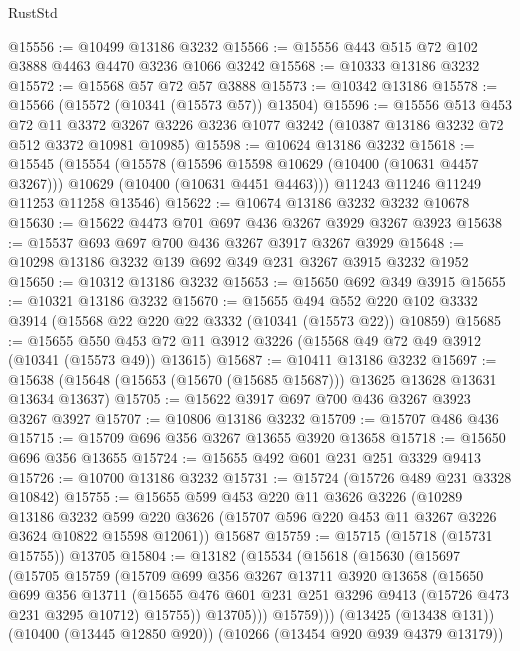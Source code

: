 \begin{lexlean}{RustStd}
\begin{coremodule}
{\begin{coremodule}
{{{{{{{{{{{{{{{{{{{{{{{{{@15556 := @10499 @13186 @3232
@15566 := @15556 @443 @515 @72 @102 @3888 @4463 @4470 @3236 @1066 @3242
@15568 := @10333 @13186 @3232
@15572 := @15568 @57 @72 @57 @3888
@15573 := @10342 @13186
@15578 := @15566 (@15572 (@10341 (@15573 @57)) @13504)
@15596 := @15556
    @513
    @453
    @72
    @11
    @3372
    @3267
    @3226
    @3236
    @1077
    @3242
    (@10387 @13186 @3232 @72 @512 @3372 @10981 @10985)
@15598 := @10624 @13186 @3232
@15618 := @15545
    (@15554
      (@15578
        (@15596 @15598 @10629 (@10400 (@10631 @4457 @3267)))
        @10629
        (@10400 (@10631 @4451 @4463)))
      @11243
      @11246
      @11249
      @11253
      @11258
      @13546)
@15622 := @10674 @13186 @3232 @3232 @10678
@15630 := @15622 @4473 @701 @697 @436 @3267 @3929 @3267 @3923
@15638 := @15537 @693 @697 @700 @436 @3267 @3917 @3267 @3929
@15648 := @10298 @13186 @3232 @139 @692 @349 @231 @3267 @3915 @3232 @1952
@15650 := @10312 @13186 @3232
@15653 := @15650 @692 @349 @3915
@15655 := @10321 @13186 @3232
@15670 := @15655
    @494
    @552
    @220
    @102
    @3332
    @3914
    (@15568 @22 @220 @22 @3332 (@10341 (@15573 @22)) @10859)
@15685 := @15655
    @550
    @453
    @72
    @11
    @3912
    @3226
    (@15568 @49 @72 @49 @3912 (@10341 (@15573 @49)) @13615)
@15687 := @10411 @13186 @3232
@15697 := @15638 (@15648 (@15653 (@15670 (@15685 @15687))) @13625 @13628 @13631 @13634 @13637)
@15705 := @15622 @3917 @697 @700 @436 @3267 @3923 @3267 @3927
@15707 := @10806 @13186 @3232
@15709 := @15707 @486 @436
@15715 := @15709 @696 @356 @3267 @13655 @3920 @13658
@15718 := @15650 @696 @356 @13655
@15724 := @15655 @492 @601 @231 @251 @3329 @9413
@15726 := @10700 @13186 @3232
@15731 := @15724 (@15726 @489 @231 @3328 @10842)
@15755 := @15655
    @599
    @453
    @220
    @11
    @3626
    @3226
    (@10289
      @13186
      @3232
      @599
      @220
      @3626
      (@15707 @596 @220 @453 @11 @3267 @3226 @3624 @10822 @15598 @12061))
    @15687
@15759 := @15715 (@15718 (@15731 @15755)) @13705
@15804 := @13182
    (@15534
      (@15618
        (@15630
          (@15697
            (@15705
              @15759
              (@15709
                @699
                @356
                @3267
                @13711
                @3920
                @13658
                (@15650
                  @699
                  @356
                  @13711
                  (@15655 @476 @601 @231 @251 @3296 @9413 (@15726 @473 @231 @3295 @10712) @15755))
                @13705)))
          @15759)))
    (@13425 (@13438 @131))
    (@10400 (@13445 @12850 @920))
    (@10266 (@13454 @920 @939 @4379 @13179))
}}}}}}}}}}}}}}}}}}}}}}}}}
\end{coremodule}}
\end{coremodule}
\end{lexlean}
